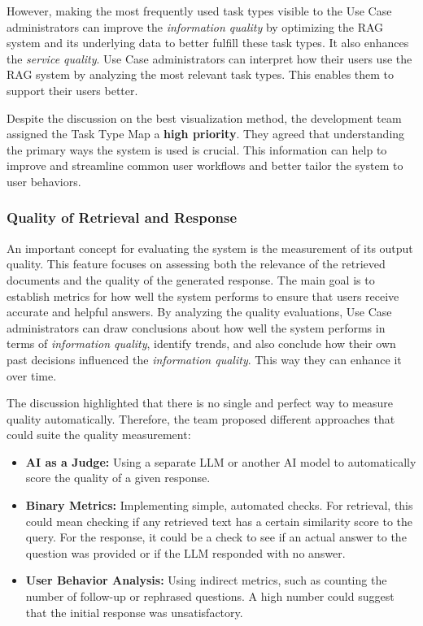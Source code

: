 \documentclass[
	english,
	ruledheaders=section,%
	class=report,%
	thesis={type=bachelor},%
	accentcolor=1b,%
	custommargins=true,%
	marginpar=false,%
	parskip=half-,%
	fontsize=11pt,%
	DIV=14,
]{tudapub}
\begin{document}
However, making the most frequently used task types visible to the Use Case administrators can improve the \textit{information quality} by optimizing the RAG system and its underlying data to better fulfill these task types. It also enhances the \textit{service quality}. Use Case administrators can interpret how their users use the RAG system by analyzing the most relevant task types. This enables them to support their users better.

Despite the discussion on the best visualization method, the development team assigned the Task Type Map a \textbf{high priority}. They agreed that understanding the primary ways the system is used is crucial. This information can help to improve and streamline common user workflows and better tailor the system to user behaviors.
\subsubsection{Quality of Retrieval and Response}
An important concept for evaluating the system is the measurement of its output quality. This feature focuses on assessing both the relevance of the retrieved documents and the quality of the generated response. The main goal is to establish metrics for how well the system performs to ensure that users receive accurate and helpful answers. By analyzing the quality evaluations, Use Case administrators can draw conclusions about how well the system performs in terms of \textit{information quality}, identify trends, and also conclude how their own past decisions influenced the \textit{information quality}. This way they can enhance it over time.

The discussion highlighted that there is no single and perfect way to measure quality automatically. Therefore, the team proposed different approaches that could suite the quality measurement:

\begin{itemize}
    \item \textbf{AI as a Judge:} Using a separate LLM or another AI model to automatically score the quality of a given response.
    \item \textbf{Binary Metrics:} Implementing simple, automated checks. For retrieval, this could mean checking if any retrieved text has a certain similarity score to the query. For the response, it could be a check to see if an actual answer to the question was provided or if the LLM responded with no answer.
    \item \textbf{User Behavior Analysis:} Using indirect metrics, such as counting the number of follow-up or rephrased questions. A high number could suggest that the initial response was unsatisfactory.
\end{itemize}
\end{document}
